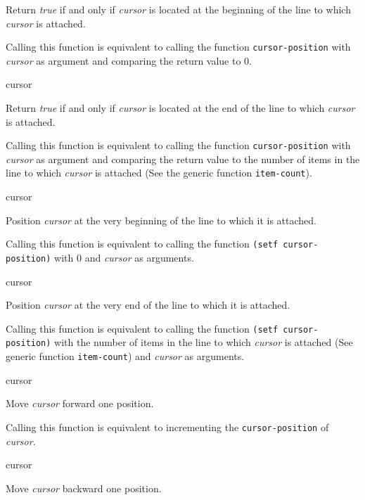 Return \textit{true} if and only if \textit{cursor} is located at the
beginning of the line to which \textit{cursor} is attached.

\ifdetached{}

Calling this function is equivalent to calling the function
\texttt{cursor-position} with \textit{cursor} as argument and
comparing the return value to $0$.  \howeverperformance{}

 {cursor}

Return \textit{true} if and only if \textit{cursor} is located at the
end of the line to which \textit{cursor} is attached.

\ifdetached{}

Calling this function is equivalent to calling the function
\texttt{cursor-position} with \textit{cursor} as argument and
comparing the return value to the number of items in the line to which
\textit{cursor} is attached (See the generic function
\texttt{item-count}).  \howeverperformance{}

 {cursor}

Position \textit{cursor} at the very beginning of the line to which it
is attached.

\ifdetached{}

Calling this function is equivalent to calling the function
\texttt{(setf cursor-position)} with $0$ and \textit{cursor} as
arguments.  \howeverperformance{}

 {cursor}

Position \textit{cursor} at the very end of the line to which it
is attached.

\ifdetached{}

Calling this function is equivalent to calling the function
\texttt{(setf cursor-position)} with the number of items in the line
to which \textit{cursor} is attached (See generic function
\texttt{item-count}) and \textit{cursor} as arguments.
\howeverperformance{}

 {cursor}

Move \textit{cursor} forward one position.

\ifdetached{}

Calling this function is equivalent to incrementing the
\texttt{cursor-position} of \textit{cursor}.  \howeverperformance{}

 {cursor}

Move \textit{cursor} backward one position.

